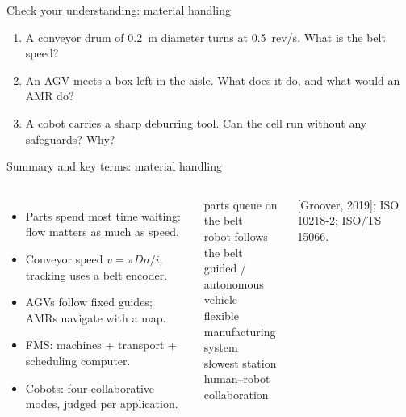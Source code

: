 \documentclass[aspectratio=169,10pt]{beamer}
\begin{document}
\begin{frame}{Check your understanding: material handling}
\begin{keybox}
\large
\begin{enumerate}
\item A conveyor drum of \SI{0.2}{m} diameter turns at \SI{0.5}{rev/s}. What is the belt speed?
\item An AGV meets a box left in the aisle. What does it do, and what would an AMR do?
\item A cobot carries a sharp deburring tool. Can the cell run without any safeguards? Why?
\end{enumerate}
\end{keybox}
\end{frame}

\begin{frame}{Summary and key terms: material handling}
\begin{columns}[T]
\begin{itemize}\small
\item Parts spend most time waiting: flow matters as much as speed.
\item Conveyor speed $v=\pi D n/i$; tracking uses a belt encoder.
\item AGVs follow fixed guides; AMRs navigate with a map.
\item FMS: machines + transport + scheduling computer.
\item Cobots: four collaborative modes, judged per application.
\end{itemize}
\begin{defbox}
\small
{} parts queue on the belt\\
 robot follows the belt\\
 guided / autonomous vehicle\\
 flexible manufacturing system\\
 slowest station\\
 human--robot collaboration
\end{defbox}
{\scriptsize\color{mkGray} [Groover, 2019]; ISO 10218-2; ISO/TS 15066.}
\end{columns}
\end{frame}
\end{document}
